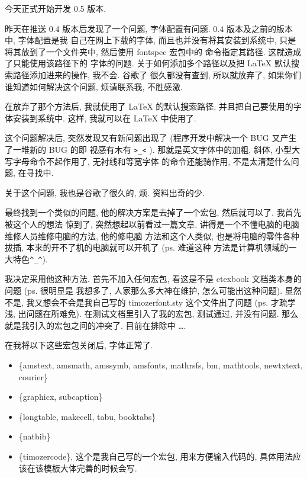 \documentclass{cugrep}
\begin{document}
今天正式开始开发 0.5 版本.

昨天在推送 0.4 版本后发现了一个问题, 字体配置有问题. 0.4 版本及之前的版本中, 字体配置是我
自己在网上下载的字体, 而且也并没有将其安装到系统中, 只是将其放到了一个文件夹中, 然后使用
fontspec 宏包中的 命令指定其路径. 这就造成了只能使用该路径下的
字体的问题. 关于如何添加多个路径以及把 \LaTeX{} 默认搜索路径添加进来的操作, 我不会. 谷歌了
很久都没有查到, 所以就放弃了, 如果你们谁知道如何解决这个问题, 烦请联系我, 不胜感激. 

在放弃了那个方法后, 我就使用了 \LaTeX{} 的默认搜索路径, 并且把自己要使用的字体安装到系统中.
这样, 我就可以在 \LaTeX{} 中使用了. 

这个问题解决后, 突然发现又有新问题出现了 (程序开发中解决一个 BUG 又产生了一堆新的 BUG 的即
视感有木有 \verb|>_<| ). 那就是英文字体中的加粗, 斜体, 小型大写字母命令不起作用了, 无衬线和等宽字体
的命令还能骑作用, 不是太清楚什么问题, 在寻找中.

关于这个问题, 我也是谷歌了很久的, 烦. 资料出奇的少.

最终找到一个类似的问题, 他的解决方案是去掉了一个宏包, 然后就可以了. 我首先被这个人的想法
惊到了, 突然想起以前看过一篇文章, 讲得是一个不懂电脑的电脑维修人员维修电脑的方法, 他的修电脑
方法和这个人类似, 也是将电脑的零件各种拔插, 本来的开不了机的电脑就可以开机了 (ps. 难道这种
方法是计算机领域的一大特色\verb|^_^|).

我决定采用他这种方法. 首先不加入任何宏包, 看这是不是 ctexbook 文档类本身的问题 (ps. 很明显是
我想多了, 人家那么多大神在维护, 怎么可能出这种问题). 显然不是, 我又想会不会是我自己写的 
timozerfont.sty 这个文件出了问题 (ps. 才疏学浅, 出问题在所难免). 在测试文档里引入了我的宏包, 
测试通过, 并没有问题. 那么就是我引入的宏包之间的冲突了. 目前在排除中 \ldots .

在我将以下这些宏包关闭后, 字体正常了.

\begin{itemize}
    \item \{amstext, amsmath, amssymb, amsfonts, mathrsfs, bm, mathtools, newtxtext, courier\}
    \item \{graphicx, subcaption\}
    \item \{longtable, makecell, tabu, booktabs\}
    \item \{natbib\}
    \item \{timozercode\}, 这个是我自己写的一个宏包, 用来方便输入代码的, 具体用法应该在该模板大体完善的时候会写.
\end{itemize}
\end{document}
